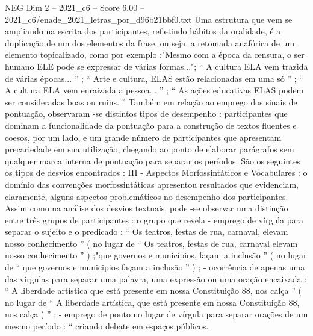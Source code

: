 \begin{textsample}{NEG Dim 2 – 2021\_c6 – Score 6.00 – 2021\_c6/enade\_2021\_letras\_por\_d96b21bbf0.txt}
Uma estrutura que vem se ampliando na escrita dos participantes, refletindo hábitos da oralidade, é a duplicação de um dos elementos da frase, ou seja, a retomada anafórica de um elemento topicalizado, como por exemplo :"Mesmo com a época da censura, o ser humano ELE pode se expressar de várias formas..."; “ A cultura ELA vem trazida de várias épocas... ” ; “ Arte e cultura, ELAS estão relacionadas em uma só ” ; “ A cultura ELA vem enraizada a pessoa... ” ; “ As ações educativas ELAS podem ser consideradas boas ou ruins. ” Também em relação ao emprego dos sinais de pontuação, observaram -se distintos tipos de desempenho : participantes que dominam a funcionalidade da pontuação para a construção de textos fluentes e coesos, por um lado, e um grande número de participantes que apresentam precariedade em sua utilização, chegando ao ponto de elaborar parágrafos sem qualquer marca interna de pontuação para separar os períodos.
São os seguintes os tipos de desvios encontrados : III - Aspectos Morfossintáticos e Vocabulares : o domínio das convenções morfossintáticas apresentou resultados que evidenciam, claramente, alguns aspectos problemáticos no desempenho dos participantes.
Assim como na análise dos desvios textuais, pode -se observar uma distinção entre três grupos de participantes : o grupo que revela - emprego de vírgula para separar o sujeito e o predicado : “ Os teatros, festas de rua, carnaval, elevam nosso conhecimento ” ( no lugar de “ Os teatros, festas de rua, carnaval elevam nosso conhecimento ” ) ;"que governos e municípios, façam a inclusão ” ( no lugar de “ que governos e municipios façam a inclusão ” ) ; - ocorrência de apenas uma das vírgulas para separar uma palavra, uma expressão ou uma oração encaixada : “ A liberdade artística que está presente em nossa Constituição 88, nos calça ” ( no lugar de “ A liberdade artística, que está presente em nossa Constituição 88, nos calça ) ” ; - emprego de ponto no lugar de vírgula para separar orações de um mesmo período : “ criando debate em espaços públicos.

\end{textsample}
